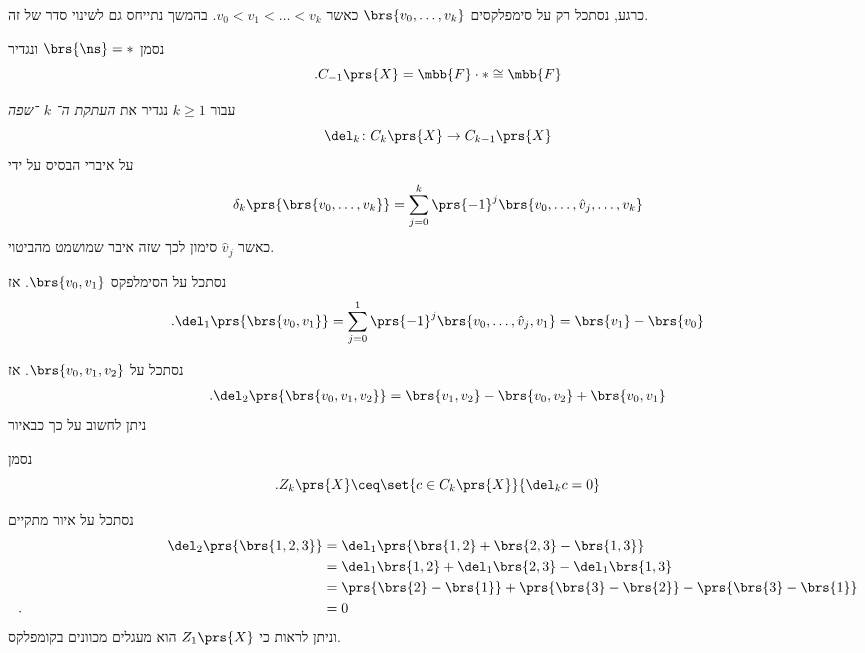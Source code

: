 \documentclass[a4paper,10pt,twoside,openany]{book}
\begin{document}
\begin{remark}
כרגע, נסתכל רק על סימפלקסים
$\brs{v_0, \ldots, v_k}$
כאשר
$v_0 < v_1 < \ldots < v_k$.
בהמשך נתייחס גם לשינוי סדר של זה.
\end{remark}

\begin{definition}
נסמן
$\brs{\ns} = *$
ונגדיר
\[\text{.} C_{-1} \prs{X} = \mbb{F} \cdot * \cong \mbb{F}\]
\end{definition}

\begin{definition}
עבור
$k \geq 1$
נגדיר את
\emph{העתקת ה־%
$k$%
־שפה}
\[\del_k \colon C_k\prs{X} \to C_{k-1} \prs{X}\]
על איברי הבסיס על ידי
\[\delta_k \prs{\brs{v_0, \ldots, v_k}} = \sum_{j=0}^k \prs{-1}^j \brs{v_0, \ldots, \hat{v}_j, \ldots, v_k}\]
כאשר
$\hat{v}_j$
סימון לכך שזה איבר שמושמט מהביטוי.
\end{definition}

\begin{example}
נסתכל על הסימלפקס
$\brs{v_0, v_1}$.
אז
\[\text{.} \del_1\prs{\brs{v_0, v_1}} = \sum_{j=0}^1 \prs{-1}^j \brs{v_0, \ldots, \hat{v}_j, v_1} = \brs{v_1} - \brs{v_0}\]
\end{example}

\begin{example}
נסתכל על
$\brs{v_0, v_1, v_2}$.
אז
\begin{align*}
\text{.} \del_2 \prs{\brs{v_0, v_1, v_2}} = \brs{v_1, v_2} - \brs{v_0, v_2} + \brs{v_0, v_1}
\end{align*}
ניתן לחשוב על כך כבאיור
\end{example}

\begin{definition}[$k$%
־מחזורים]
נסמן
\[\text{.} Z_k\prs{X} \ceq \set{c \in C_k\prs{X}}{\del_k c = 0}\]
\end{definition}

\begin{example}
נסתכל על איור
מתקיים
\begin{align*}
\del_2\prs{\brs{1,2,3}}
&=
\del_1\prs{\brs{1,2} + \brs{2,3} - \brs{1,3}}
\\&= \del_1\brs{1,2} + \del_1 \brs{2,3} - \del_1\brs{1,3}
\\&= \prs{\brs{2} - \brs{1}} + \prs{\brs{3} - \brs{2}} - \prs{\brs{3} - \brs{1}}
\\ \text{.} \hphantom{\del_!\prs{\brs{1,2} + \brs{2,3} - \brs{1,3}}} &= 0
\end{align*}
וניתן לראות כי
$Z_1\prs{X}$
הוא מעגלים מכוונים בקומפלקס.
\end{example}
\end{document}
